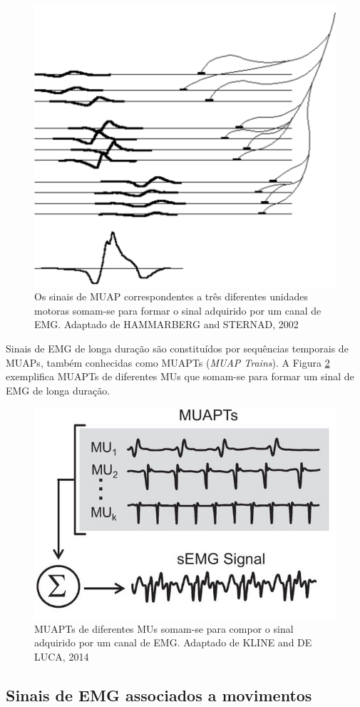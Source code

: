 \documentclass[
	12pt,				%
	openright,			%
	oneside,
	a4paper,			%
	english,			%
	francais,				%
	spanish,			%
	brazil				%
	]{abntex2}
\begin{document}
\begin{figure}
\centering
\includegraphics[width=0.6\linewidth]{../img/MUAP_soma.PNG}
\caption{Os sinais de MUAP correspondentes a três diferentes unidades motoras somam-se para formar o sinal adquirido por um canal de EMG. Adaptado de HAMMARBERG and STERNAD, 2002}
\label{fig:MUAP_soma}
\end{figure}
	
	Sinais de EMG de longa duração são constituídos por sequências temporais de MUAPs, também conhecidas como MUAPTs (\emph{MUAP Trains}). A Figura \ref{fig:MUAP_trains} exemplifica MUAPTs de diferentes MUs que somam-se para formar um sinal de EMG de longa duração.
	
\begin{figure}
\centering
\includegraphics[width=0.6\linewidth]{../img/MUAP_trains.jpg}
\caption{MUAPTs de diferentes MUs somam-se para compor o sinal adquirido por um canal de EMG. Adaptado de KLINE and DE LUCA, 2014}
\label{fig:MUAP_trains}
\end{figure}

\subsection{Sinais de EMG associados a movimentos}
\end{document}
